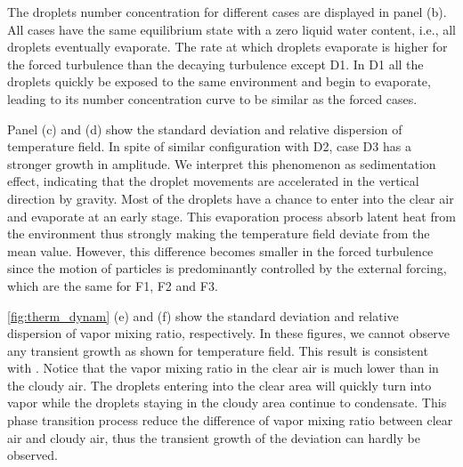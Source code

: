 The droplets number concentration for different cases are displayed in panel
(b). All cases have the same equilibrium state with a zero liquid water
content, i.e., all droplets eventually evaporate. The rate at which droplets
evaporate is higher for the forced turbulence than the decaying turbulence
except D1. In D1 all the droplets quickly be exposed to the same environment
and begin to evaporate, leading to its number concentration curve to be similar
as the forced cases.

Panel (c) and (d) show the standard deviation and relative dispersion of
temperature field. In spite of similar configuration with D2, case D3 has a
stronger growth in amplitude. We interpret this phenomenon as sedimentation
effect, indicating that the droplet movements are accelerated in the vertical
direction by gravity. Most of the droplets have a chance to enter into the
clear air and evaporate at an early stage. This evaporation process absorb
latent heat from the environment thus strongly making the temperature field
deviate from the mean value. However, this difference becomes smaller in the
forced turbulence since the motion of particles is predominantly controlled by
the external forcing, which are the same for F1, F2 and F3.

\ref{fig:therm_dynam} (e) and (f) show the standard deviation and relative
dispersion of vapor mixing ratio, respectively. In these figures, we cannot
observe any transient growth as shown for temperature field. This result is
consistent with \cite{Kumar14}. Notice that the vapor mixing ratio in the clear
air is much lower than in the cloudy air. The droplets entering into the clear
area will quickly turn into vapor while the droplets staying in the cloudy area
continue to condensate. This phase transition process reduce the difference of
vapor mixing ratio between clear air and cloudy air, thus the transient growth
of the deviation can hardly be observed.

